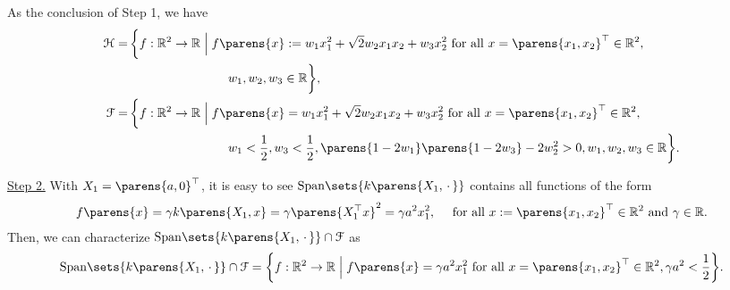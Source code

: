 	As the conclusion of Step 1, we have 
	\begin{align}
		\calH = & \, \bigg\{f: \Real^2 \to \Real \Bigm| f \parens{x} := w_1 x_1^2 + \sqrt{2} w_2 x_1 x_2 + w_3 x_2^2 \text{ for all } x = \parens{x_1, x_2}^\top \in \Real^2, \nonumber \\ 
		& \quad \quad \qquad \qquad \qquad w_1, w_2, w_3 \in \Real \bigg\}, \label{eq-example-nll-representer-theorem-fails-rkhs} \\ 
		\calF = & \, \bigg\{f: \Real^2 \to \Real \Bigm| f \parens{x} = w_1 x_1^2 + \sqrt{2} w_2 x_1 x_2 + w_3 x_2^2 \text{ for all } x = \parens{x_1, x_2}^\top \in \Real^2, \nonumber \\ 
		& \quad \qquad \qquad \qquad \quad w_1 < \frac{1}{2}, w_3 < \frac{1}{2}, \parens{1 - 2w_1} \parens{1 - 2w_3} - 2 w_2^2 > 0, w_1, w_2, w_3 \in \Real \bigg\}. \label{eq-example-nll-representer-theorem-fails-F}
	\end{align}
	
	\underline{Step 2.} With $X_1 = \parens{a, 0}^\top$, it is easy to see $\mathrm{Span} \sets{k \parens{X_1, \,\cdot\,}}$ contains all functions of the form 
	\begin{align*}
		f \parens{x} = \gamma k \parens{X_1, x} = \gamma \parens{X_1^\top x}^2 = \gamma a^2 x_1^2, \quad \text{ for all } x := \parens{x_1, x_2}^\top \in \Real^2 \text{ and } \gamma \in \Real. 
	\end{align*}
	Then, we can characterize $\mathrm{Span} \sets{k \parens{X_1, \,\cdot\,}} \cap \calF$ as 
	\begin{align*}
		\mathrm{Span} \sets{k \parens{X_1, \,\cdot\,}} \cap \calF = \bigg\{f: \Real^2 \to \Real \Bigm| f \parens{x} = \gamma a^2 x_1^2 \text{ for all } x = \parens{x_1, x_2}^\top \in \Real^2, \gamma a^2 < \frac{1}{2} \bigg\}. 
	\end{align*}
	

